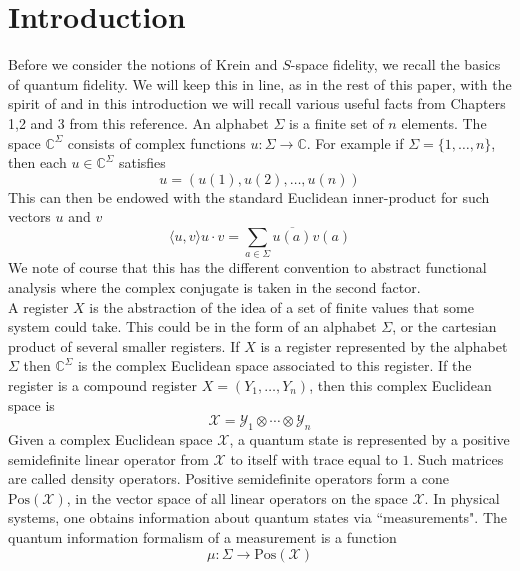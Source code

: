\documentclass{amsart}
\numberwithin{equation}{section}
\theoremstyle{definition}
\theoremstyle{plain}
\theoremstyle{solutionstyle}
\begin{document}
\section{Introduction}
Before we consider the notions of Krein and $S$-space fidelity, we recall the basics of quantum fidelity. We will keep this in line, as in the rest of this paper, with the spirit of \cite{Watrous_2018} and in this introduction we  will recall various useful facts from Chapters 1,2 and 3 from this reference. An alphabet $\Sigma$ is a finite set of $n$ elements. The space $\mathbb{C}^\Sigma$ consists of complex functions $u:\Sigma\to \mathbb{C}$. For example if $\Sigma=\{1,\dots,n\}$, then each $u\in\mathbb{C}^{\Sigma}$ satisfies \begin{equation*}
    u=(u(1), u(2),\dots,u(n))
\end{equation*}
This can then be endowed with the standard Euclidean inner-product for such vectors $u$ and $v$ \begin{equation*}\langle u,v\rangle u\cdot v=\sum_{a\in \Sigma}\overline{u(a)}v(a)\end{equation*}
We note of course that this has the different convention to abstract functional analysis where the complex conjugate is taken in the second factor.\\
A register $X$ is the abstraction of the idea of a set of finite values that some system could take. This could be in the form of an alphabet $\Sigma$, or the cartesian product of several smaller registers. If $X$ is a register represented by the alphabet $\Sigma$ then $\mathbb{C}^\Sigma$ is the complex Euclidean space associated to this register. If the register is a compound register $X=(Y_1,\dots,Y_n)$, then this complex Euclidean space is
\begin{equation*}
    \mathcal{X}=\mathcal{Y}_1\otimes \cdots\otimes \mathcal{Y}_n
\end{equation*}
Given a complex Euclidean space $\mathcal{X}$, a quantum state is represented by a positive semidefinite linear operator from $\mathcal{X}$ to itself with trace equal to $1$. Such matrices are called density operators. Positive semidefinite operators form a cone $\mathrm{Pos}(\mathcal{X})$, in the vector space of all linear operators on the space $\mathcal{X}$. In physical systems, one obtains information about quantum states via ``measurements". The quantum information formalism of a measurement is a function \begin{equation*}
    \mu: \Sigma \to \mathrm{Pos}(\mathcal{X}) 
\end{equation*}
\end{document}
